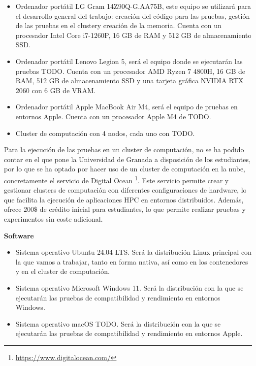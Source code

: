 \begin{itemize}
    \item Ordenador portátil LG Gram 14Z90Q-G.AA75B, este equipo se utilizará para el desarrollo general del trabajo: creación del código para las pruebas, gestión de las pruebas en el clustery creación de la memoria. Cuenta con un procesador Intel Core i7-1260P, 16 GB de RAM y 512 GB de almacenamiento SSD.

    \item Ordenador portátil Lenovo Legion 5, será el equipo donde se ejecutarán las pruebas {TODO}. Cuenta con un procesador AMD Ryzen 7 4800H, 16 GB de RAM, 512 GB de almacenamiento SSD y una tarjeta gráfica NVIDIA RTX 2060 con 6 GB de VRAM.

    \item Ordenador portátil Apple MacBook Air M4, será el equipo de pruebas en entornos Apple. Cuenta con un procesador Apple M4 de {TODO}.

    \item Cluster de computación con 4 nodos, cada uno con {TODO}.
\end{itemize}

Para la ejecución de las pruebas en un cluster de computación, no se ha podido contar en el que pone la Universidad de Granada a disposición de los estudiantes, por lo que se ha optado por hacer uso de un cluster de computación en la nube, concretamente el servicio de Digital Ocean \footnote{\url{https://www.digitalocean.com/}}. Este servicio permite crear y gestionar clusters de computación con diferentes configuraciones de hardware, lo que facilita la ejecución de aplicaciones HPC en entornos distribuidos. Además, ofrece $200\$$ de crédito inicial para estudiantes, lo que permite realizar pruebas y experimentos sin coste adicional.

\textbf{Software}

\begin{itemize}
    \item Sistema operativo Ubuntu 24.04 LTS. Será la distribución Linux principal con la que vamos a trabajar, tanto en forma nativa, así como en los contenedores y en el cluster de computación.

    \item Sistema operativo Microsoft Windows 11. Será la distribución con la que se ejecutarán las pruebas de compatibilidad y rendimiento en entornos Windows.

    \item Sistema operativo macOS {TODO}. Será la distribución con la que se ejecutarán las pruebas de compatibilidad y rendimiento en entornos Apple.
\end{itemize}


